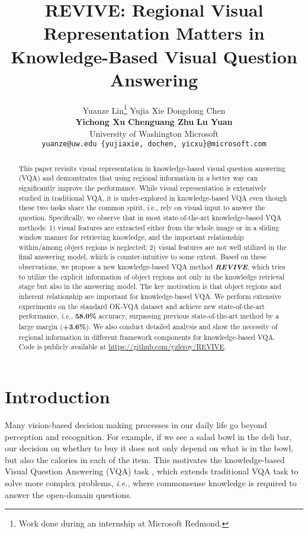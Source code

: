 \documentclass{article}
\title{REVIVE: Regional Visual Representation Matters in Knowledge-Based Visual Question Answering}
\author{
  Yuanze Lin\thanks{Work done during an internship at Microsoft Redmond.} \quad\quad Yujia Xie \quad\quad Dongdong Chen \quad\\ \textbf{Yichong Xu} \quad\quad \textbf{Chenguang Zhu} \quad\quad \textbf{Lu Yuan} \\
   University of Washington \quad\quad Microsoft \\
{\tt\small{yuanze@uw.edu} \quad\quad\quad  \tt\small{\{yujiaxie, dochen, yicxu\}@microsoft.com}}
}
\begin{document}
\maketitle

\begin{abstract}
This paper revisits visual representation in knowledge-based visual question answering (VQA) and demonstrates that using regional information in a better way can significantly improve the performance. While visual representation is extensively studied in  traditional VQA, it is under-explored in knowledge-based VQA even though these two tasks share the common spirit, i.e., rely on visual input to answer the question. Specifically, we observe that in most state-of-the-art knowledge-based VQA methods: 1) visual features are  extracted either from the whole image or in a sliding window manner for retrieving knowledge, and the important relationship within/among object regions is neglected; 2) visual features are not well utilized in the final answering model, which is counter-intuitive to some extent. Based on these observations, we propose a new knowledge-based VQA method \textbf{\textit{REVIVE}}, which tries to utilize the explicit information of object regions not only in the knowledge retrieval stage but also in the answering model. The key motivation is that object regions and inherent relationship are important for knowledge-based VQA. We perform extensive experiments on the standard OK-VQA dataset and achieve new state-of-the-art performance, \textit{i.e.}, \textbf{58.0\%} accuracy, surpassing previous state-of-the-art method by a large margin (\textbf{+3.6\%}). We also conduct detailed analysis and show the necessity of regional information in different framework components for knowledge-based VQA. Code is publicly available at \url{https://github.com/yzleroy/REVIVE}.

\end{abstract}


\section{Introduction}
Many vision-based decision making processes in our daily life go beyond perception and recognition. For example, if we see a salad bowl in the deli bar, our decision on whether to buy it does not only depend on what is in the bowl, but also the calories in each of the item. This motivates the knowledge-based Visual Question Answering (VQA) task \cite{marino2019ok}, which extends traditional VQA task \cite{antol2015vqa}  to solve more complex problems, \textit{i.e.}, where commonsense knowledge is required to answer the open-domain questions. 
\end{document}
